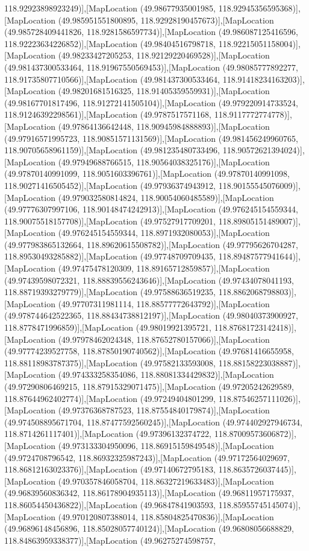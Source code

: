 118.92923898923249)],[MapLocation (49.98677935001985, 118.92945356595368)],[MapLocation (49.985951551800895, 118.92928190457673)],[MapLocation (49.985728409441826, 118.9281586597734)],[MapLocation (49.986087125416596, 118.92223634226852)],[MapLocation (49.98404516798718, 118.92215051158004)],[MapLocation (49.98233427205253, 118.92129220469528)],[MapLocation (49.981437300533464, 118.91967550569453)],[MapLocation (49.98085777892277, 118.91735807710566)],[MapLocation (49.981437300533464, 118.91418234163203)],[MapLocation (49.98201681516325, 118.91405359559931)],[MapLocation (49.98167701817496, 118.91272141505104)],[MapLocation (49.979220914733524, 118.91246392298561)],[MapLocation (49.9787517571168, 118.9117772774778)],[MapLocation (49.97864136642448, 118.90945984888893)],[MapLocation (49.97916571995723, 118.90851571131569)],[MapLocation (49.981456249960765, 118.90705658961159)],[MapLocation (49.981235480733496, 118.90572621394024)],[MapLocation (49.97949688766515, 118.90564038325176)],[MapLocation (49.97870140991099, 118.9051603396761)],[MapLocation (49.97870140991098, 118.90271416505452)],[MapLocation (49.97936374943912, 118.90155545076009)],[MapLocation (49.979032580814824, 118.90054060485589)],[MapLocation (49.97776307997106, 118.90148474242913)],[MapLocation (49.976245154559344, 118.90075518157708)],[MapLocation (49.97527917709201, 118.89805151489007)],[MapLocation (49.976245154559344, 118.8971932080053)],[MapLocation (49.977983865132664, 118.89620615508782)],[MapLocation (49.97795626704287, 118.89530493285882)],[MapLocation (49.97748709709435, 118.89487577941644)],[MapLocation (49.97475478120309, 118.89165712859857)],[MapLocation (49.97439598072321, 118.88839556243646)],[MapLocation (49.97434078041193, 118.88719393279779)],[MapLocation (49.97588636519235, 118.8862068798803)],[MapLocation (49.97707311981114, 118.88577772643792)],[MapLocation (49.978744642522365, 118.88434738812197)],[MapLocation (49.98040373900927, 118.8778471996859)],[MapLocation (49.98019921395721, 118.87681723142418)],[MapLocation (49.97978462024348, 118.87652780157066)],[MapLocation (49.97774239527758, 118.87850190740562)],[MapLocation (49.97681416655958, 118.88118983787375)],[MapLocation (49.97582133593008, 118.88158223038887)],[MapLocation (49.974333258354086, 118.88081334429832)],[MapLocation (49.97290806469215, 118.87915329071475)],[MapLocation (49.97205242629589, 118.87644962402774)],[MapLocation (49.97249404801299, 118.87546257111026)],[MapLocation (49.97376368787523, 118.87554840179874)],[MapLocation (49.974508895671704, 118.87477592560245)],[MapLocation (49.974402927946734, 118.8714261117401)],[MapLocation (49.97396132374722, 118.87009573606872)],[MapLocation (49.973133304950096, 118.86915159849548)],[MapLocation (49.9724708796542, 118.86932325987243)],[MapLocation (49.97172564029697, 118.86812163023376)],[MapLocation (49.97140672795183, 118.8635726037445)],[MapLocation (49.970357846058704, 118.86327219633483)],[MapLocation (49.96839560836342, 118.86178904935113)],[MapLocation (49.96811957175937, 118.86054450436822)],[MapLocation (49.96847841903593, 118.85955745145074)],[MapLocation (49.970120807388014, 118.85804825470836)],[MapLocation (49.96896148456896, 118.85028057740124)],[MapLocation (49.96808056688829, 118.84863959338377)],[MapLocation (49.96275274598757, 